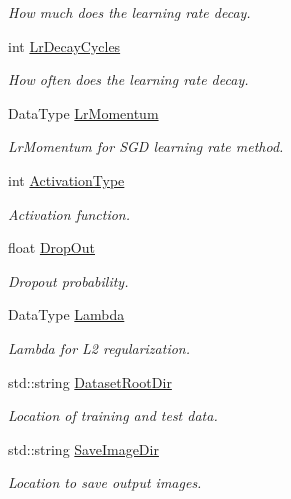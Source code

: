 \begin{DoxyCompactItemize}
\begin{DoxyCompactList}\small\item\em How much does the learning rate decay. \end{DoxyCompactList}\item 
int \hyperlink{classlbann_1_1TrainingParams_a4b793a3cc84fbb1029ad140730f76378}{Lr\+Decay\+Cycles}
\begin{DoxyCompactList}\small\item\em How often does the learning rate decay. \end{DoxyCompactList}\item 
Data\+Type \hyperlink{classlbann_1_1TrainingParams_a6d1337378066e4762a3052535c7edc0f}{Lr\+Momentum}
\begin{DoxyCompactList}\small\item\em Lr\+Momentum for S\+GD learning rate method. \end{DoxyCompactList}\item 
int \hyperlink{classlbann_1_1TrainingParams_a2b190763ecc3e2bb9b9058bc0ff40845}{Activation\+Type}
\begin{DoxyCompactList}\small\item\em Activation function. \end{DoxyCompactList}\item 
float \hyperlink{classlbann_1_1TrainingParams_a682b2fe0b572a0df36a7d5f35d6edc41}{Drop\+Out}
\begin{DoxyCompactList}\small\item\em Dropout probability. \end{DoxyCompactList}\item 
Data\+Type \hyperlink{classlbann_1_1TrainingParams_ae423ffd43d56baec23cd336611c2df51}{Lambda}
\begin{DoxyCompactList}\small\item\em Lambda for L2 regularization. \end{DoxyCompactList}\item 
std\+::string \hyperlink{classlbann_1_1TrainingParams_a14bda5205da357abe30d7685735932dd}{Dataset\+Root\+Dir}
\begin{DoxyCompactList}\small\item\em Location of training and test data. \end{DoxyCompactList}\item 
std\+::string \hyperlink{classlbann_1_1TrainingParams_a05e53af778b1e88671b839f860e83a84}{Save\+Image\+Dir}
\begin{DoxyCompactList}\small\item\em Location to save output images. \end{DoxyCompactList}\item 

\end{DoxyCompactItemize}

